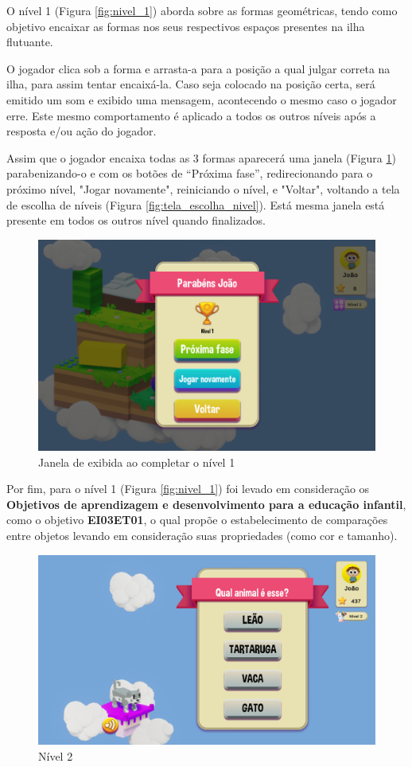 \documentclass[article,12pt,openany,oneside,a4paper,english,brazil]{abntex2}
\begin{document}
O nível 1 (Figura \ref{fig:nivel_1}) aborda sobre as formas geométricas, tendo como objetivo encaixar as formas nos seus respectivos espaços presentes na ilha flutuante.

O jogador clica sob a forma e arrasta-a para a posição a qual julgar correta na ilha, para assim tentar encaixá-la. Caso seja colocado na posição certa, será emitido um som e exibido uma mensagem, acontecendo o mesmo caso o jogador erre. Este mesmo comportamento é aplicado a todos os outros níveis após a resposta e/ou ação do jogador.

Assim que o jogador encaixa todas as 3 formas aparecerá uma janela (Figura \ref{fig:nivel_1_concluido}) parabenizando-o e com os botões de “Próxima fase”, redirecionando para o próximo nível, "Jogar novamente", reiniciando o nível, e "Voltar", voltando a tela de escolha de níveis (Figura \ref{fig:tela_escolha_nivel}). Está mesma janela está presente em todos os outros nível quando finalizados.

\begin{figure}[H]
    \centering
    \caption{Janela de exibida ao completar o nível 1}
    \label{fig:nivel_1_concluido}
    \includegraphics[width=0.8\linewidth]{GameScreenshots/Win.png}
\end{figure}

Por fim, para o nível 1 (Figura \ref{fig:nivel_1}) foi levado em consideração os \textbf{Objetivos de aprendizagem e desenvolvimento para a educação infantil}, como o objetivo \textbf{EI03ET01}, o qual propõe o estabelecimento de comparações entre objetos levando em consideração suas propriedades (como cor e tamanho).

\begin{figure}[H]
    \centering
    \caption{Nível 2}
    \label{fig:nivel_2}
    \includegraphics[width=0.8\linewidth]{GameScreenshots/Level2.png}
\end{figure}
\end{document}
